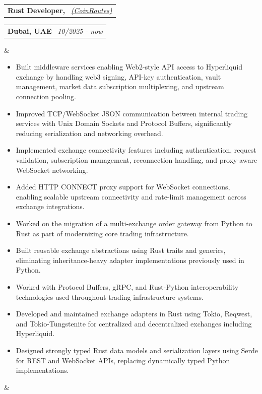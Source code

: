 \documentclass[11pt,a4paper,sans]{moderncv}
\makeatletter
\newcommand*{\customcventry}[7][0.13em]{
  \begin{tabular}{@{}l}
    {\bfseries #4} \
    {\itshape #3}
  \end{tabular}
  \hfill
  \begin{tabular}{l@{}}
    {\bfseries #5} \
    {\itshape #2}
  \end{tabular}
  \ifx&#7&
  \else{\
    \begin{minipage}{\maincolumnwidth}
      \small#7
  \end{minipage}}\fi
  \par\addvspace{#1}
}
\makeatother
\begin{document}
\customcventry{10/2025 ‐
now }{{\color{blue}\href{https://coinroutes.com/en/}{(CoinRoutes)}}}{Rust Developer,}{Dubai, UAE}{} {{
    \begin{itemize}[leftmargin=0.6cm, label={\textbullet}]
        \vspace{0.6em}
      \item Built middleware services enabling Web2-style API access to Hyperliquid exchange by handling web3 signing, API-key authentication, vault management, market data subscription multiplexing, and upstream connection pooling.
      \item Improved TCP/WebSocket JSON communication between internal trading services with Unix Domain Sockets and Protocol Buffers, significantly reducing serialization and networking overhead.
      \item Implemented exchange connectivity features including authentication, request validation, subscription management, reconnection handling, and proxy-aware WebSocket networking.
      \item Added HTTP CONNECT proxy support for WebSocket connections, enabling scalable upstream connectivity and rate-limit management across exchange integrations.
      \item Worked on the migration of a multi-exchange order gateway from Python to Rust as part of modernizing core trading infrastructure.
      \item Built reusable exchange abstractions using Rust traits and generics, eliminating inheritance-heavy adapter implementations previously used in Python.
      \item Worked with Protocol Buffers, gRPC, and Rust-Python interoperability technologies used throughout trading infrastructure systems.
      \item Developed and maintained exchange adapters in Rust using Tokio, Reqwest, and Tokio-Tungstenite for centralized and decentralized exchanges including Hyperliquid.
      \item Designed strongly typed Rust data models and serialization layers using Serde for REST and WebSocket APIs, replacing dynamically typed Python implementations.
    \end{itemize}
}}
\end{document}
